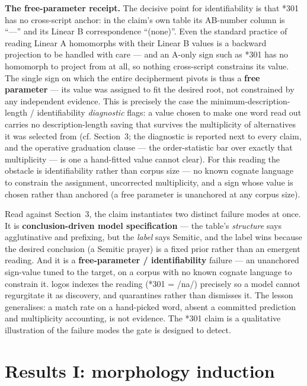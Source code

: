 \textbf{The free-parameter receipt.} The decisive point for identifiability
is that *301 has no cross-script anchor: in the claim's own table its
AB-number column is ``---'' and its Linear B correspondence ``(none)''.
Even the standard practice of reading Linear A homomorphs with their Linear
B values is a backward projection to be handled with care
\citep[already cautioned by Duhoux 1989, apud Davis 2013, p.~38
n.~11]{steele2017} --- and an A-only sign such as *301 has no homomorph to
project from at all, so nothing cross-script constrains its value. The
single sign on which the entire decipherment pivots is thus a \textbf{free
parameter} --- its value was assigned to fit the desired root, not
constrained by any independent evidence. This is precisely the case the
minimum-description-length / identifiability \emph{diagnostic} flags: a
value chosen to make one word read out carries no description-length saving
that survives the multiplicity of alternatives it was selected from (cf.
Section~3; the diagnostic is reported next to every claim, and the
operative graduation clause --- the order-statistic bar over exactly that
multiplicity --- is one a hand-fitted value cannot clear). For this reading
the obstacle is identifiability rather than corpus size --- no known cognate
language to constrain the assignment, uncorrected multiplicity, and a sign
whose value is chosen rather than anchored (a free parameter is unanchored
at any corpus size).

Read against Section~3, the claim instantiates two distinct failure modes
at once. It is \textbf{conclusion-driven model specification} --- the
table's \emph{structure} says agglutinative and prefixing, but the
\emph{label} says Semitic, and the label wins because the desired
conclusion (a Semitic prayer) is a fixed prior rather than an emergent
reading. And it is a \textbf{free-parameter / identifiability} failure ---
an unanchored sign-value tuned to the target, on a corpus with no known
cognate language to constrain it. logos indexes the reading (*301 = /na/)
precisely so a model cannot regurgitate it as discovery, and quarantines
rather than dismisses it. The lesson generalises: a match rate on a
hand-picked word, absent a committed prediction and multiplicity
accounting, is not evidence. The *301 claim is a qualitative illustration
of the failure modes the gate is designed to detect.

\section{Results I: morphology induction}

